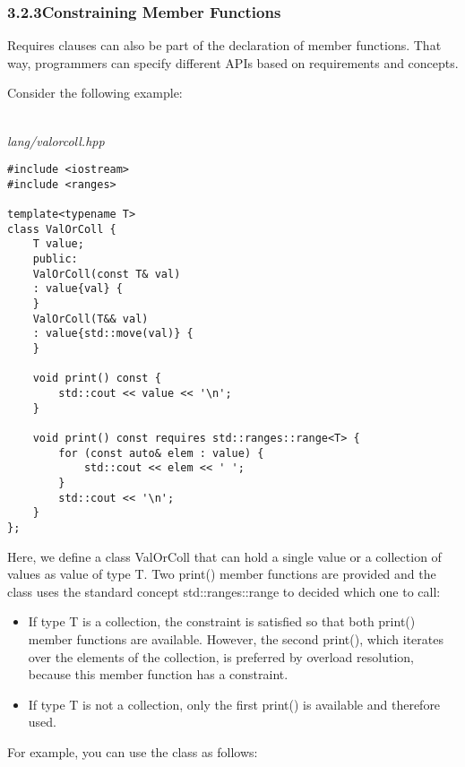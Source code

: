 \subsubsection*{ 3.2.3\hspace{0.2cm}Constraining Member Functions}

Requires clauses can also be part of the declaration of member functions. That way, programmers can specify different APIs based on requirements and concepts.

Consider the following example:

\noindent
\hspace*{\fill} \\ %
\textit{lang/valorcoll.hpp}

\begin{lstlisting}[style=styleCXX]
#include <iostream>
#include <ranges>

template<typename T>
class ValOrColl {
	T value;
	public:
	ValOrColl(const T& val)
	: value{val} {
	}
	ValOrColl(T&& val)
	: value{std::move(val)} {
	}
	
	void print() const {
		std::cout << value << '\n';
	}
	
	void print() const requires std::ranges::range<T> {
		for (const auto& elem : value) {
			std::cout << elem << ' ';
		}
		std::cout << '\n';
	}
};
\end{lstlisting}

Here, we define a class ValOrColl that can hold a single value or a collection of values as value of type T. Two print() member functions are provided and the class uses the standard concept std::ranges::range to decided which one to call:

\begin{itemize}
\item
If type T is a collection, the constraint is satisfied so that both print() member functions are available. However, the second print(), which iterates over the elements of the collection, is preferred by overload resolution, because this member function has a constraint.

\item
If type T is not a collection, only the first print() is available and therefore used.
\end{itemize}

For example, you can use the class as follows:

